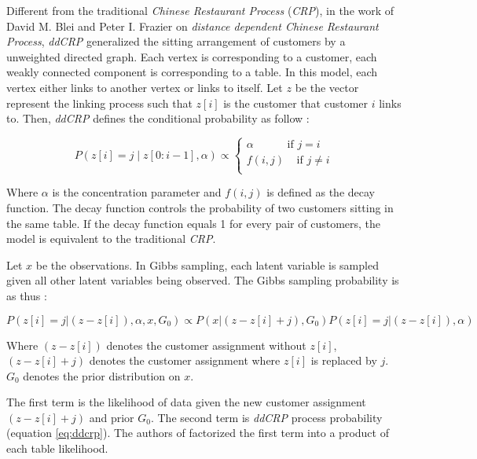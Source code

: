 Different from the traditional \emph{Chinese Restaurant Process} (\emph{CRP}), in the work of  David M. Blei and Peter I. Frazier on \emph{distance dependent Chinese Restaurant Process}, \emph{ddCRP} \cite{blei2011distance} generalized the sitting arrangement of customers by a unweighted directed graph. Each vertex is corresponding to a customer, each weakly connected component is corresponding to a table. In this model, each vertex either links to another vertex or links to itself. Let $z$ be the vector represent the linking process such that $z[i]$ is the customer that customer $i$ links to. Then, \emph{ddCRP} defines the conditional probability as follow \cite{blei2011distance}:

\begin{equation}
     P(z[i] = j \;|\; z[0:i-1], \alpha) \propto \left\{
    \begin{array}{ll}
        \alpha \;\;\;\;\;\;\;\;\;\;\; \text{if $j = i$}\\
        f(i, j) \;\;\;\; \text{if $j \neq i$}\\
    \end{array}
    \right.
    \label{eq:ddcrp}
\end{equation}

Where $\alpha$ is the concentration parameter and $f(i, j)$ is defined as the decay function. The decay function controls the probability of two customers sitting in the same table. If the decay function equals 1 for every pair of customers, the model is equivalent to the traditional \emph{CRP}.

Let $x$ be the observations. In Gibbs sampling, each latent variable is sampled given all other latent variables being observed. The Gibbs sampling probability is as thus \cite{blei2011distance}:

\begin{equation}
    P(z[i] = j | (z - z[i]), \alpha, x, G_0) \propto P(x | (z - z[i] + j), G_0) P(z[i] = j | (z - z[i]), \alpha)
    \label{eq:gibbs_fac}
\end{equation}

Where $(z - z[i])$ denotes the customer assignment without $z[i]$,  $(z - z[i] + j)$ denotes the customer assignment where $z[i]$ is replaced by $j$. $G_0$ denotes the prior distribution on $x$.

The first term is the likelihood of data given the new customer assignment $(z - z[i] + j)$ and prior $G_0$. The second term  is \emph{ddCRP} process probability (equation \ref{eq:ddcrp}). The authors of \cite{blei2011distance} factorized the first term into a product of each table likelihood.

